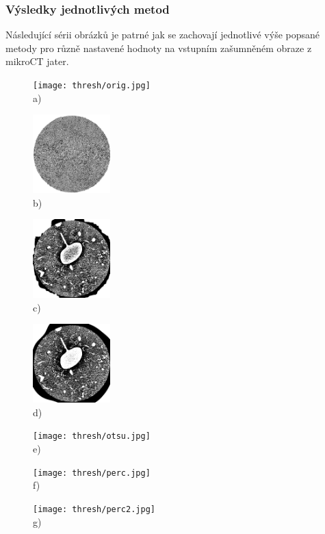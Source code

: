 \documentclass{thesis}%
\begin{document}
 \subsubsection{Výsledky jednotlivých metod}
 Následující sérii obrázků je patrné jak se zachovají jednotlivé výše popsané metody pro různě nastavené hodnoty na vstupním zašumněném obraze z mikroCT jater.

  \begin{figure}[htp!]
  \centering
  
   \begin{minipage}[c]{\textwidth}
	\centering\texttt{[image: thresh/orig.jpg]}\\
     a)
   \end{minipage}
    \begin{minipage}[c]{0.3\textwidth}
	\centering\includegraphics[width=3cm]{thresh/adap1.jpg}\\
     b)
   \end{minipage}
    \begin{minipage}[c]{0.3\textwidth}
	\centering\includegraphics[width=3cm]{thresh/adap2.jpg}\\
     c)
   \end{minipage}
    \begin{minipage}[c]{0.3\textwidth}
	\centering\includegraphics[width=3cm]{thresh/adap3.jpg}\\
     d)
   \end{minipage}
    \begin{minipage}[c]{0.3\textwidth}
	\centering\texttt{[image: thresh/otsu.jpg]}\\
     e)
   \end{minipage}
    \begin{minipage}[c]{0.3\textwidth}
	\centering\texttt{[image: thresh/perc.jpg]}\\
     f)
   \end{minipage}
    \begin{minipage}[c]{0.3\textwidth}
	\centering\texttt{[image: thresh/perc2.jpg]}\\
     g)
   \end{minipage}


\end{figure}
\end{document}
